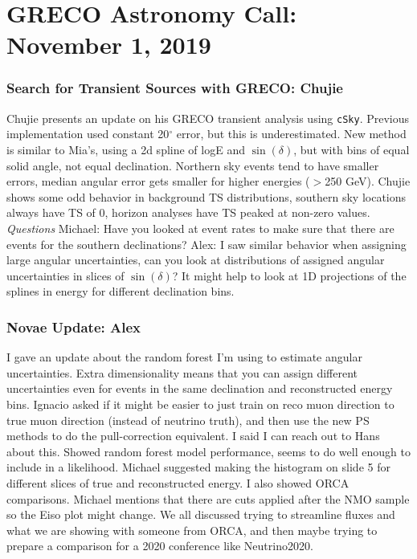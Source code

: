 \chapter{GRECO Astronomy Call: November 1, 2019}

\subsection{Search for Transient Sources with GRECO: Chujie}
Chujie presents an update on his GRECO transient analysis using \texttt{cSky}. Previous implementation used constant 20$^{\circ}$ error, but this is underestimated. New method is similar to Mia's, using a 2d spline of logE and $\sin(\delta)$, but with bins of equal solid angle, not equal declination. Northern sky events tend to have smaller errors, median angular error gets smaller for higher energies ($>$250 GeV). Chujie shows some odd behavior in background TS distributions, southern sky locations always have TS of 0, horizon analyses have TS peaked at non-zero values. 
\textit{Questions} Michael: Have you looked at event rates to make sure that there are events for the southern declinations? Alex: I saw similar behavior when assigning large angular uncertainties, can you look at distributions of assigned angular uncertainties in slices of $\sin(\delta)$? It might help to look at 1D projections of the splines in energy for different declination bins. 

\subsection{Novae Update: Alex}
I gave an update about the random forest I'm using to estimate angular uncertainties. Extra dimensionality means that you can assign different uncertainties even for events in the same declination and reconstructed energy bins. Ignacio asked if it might be easier to just train on reco muon direction to true muon direction (instead of neutrino truth), and then use the new PS methods to do the pull-correction equivalent. I said I can reach out to Hans about this. Showed random forest model performance, seems to do well enough to include in a likelihood. Michael suggested making the histogram on slide 5 for different slices of true and reconstructed energy. I also showed ORCA comparisons. Michael mentions that there are cuts applied after the NMO sample so the Eiso plot might change. We all discussed trying to streamline fluxes and what we are showing with someone from ORCA, and then maybe trying to prepare a comparison for a 2020 conference like Neutrino2020.


